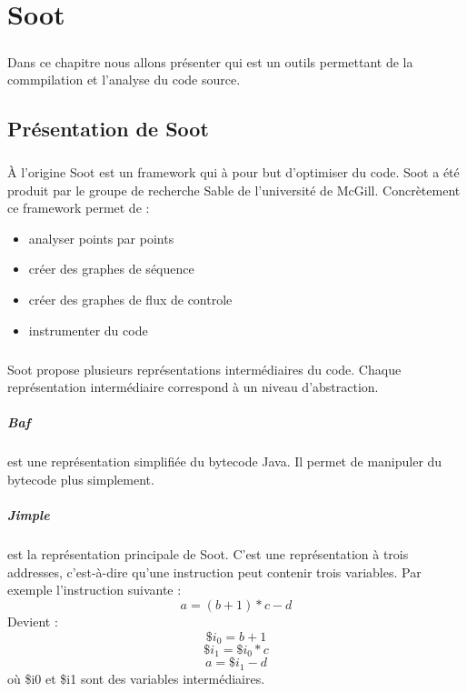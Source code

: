 \chapter{Soot}

\paragraph{}
Dans ce chapitre nous allons présenter \cite{Soot} qui est un outils permettant 
de la commpilation et l'analyse du code source.

	\section{Présentation de Soot}

	\paragraph{}
	À l'origine Soot est un framework qui à pour but d'optimiser du code. 
Soot a été produit par le groupe de recherche Sable de l'université de McGill. 
Concrètement ce framework permet de :

	\begin{itemize}
		\item analyser points par points
		\item créer des graphes de séquence
		\item créer des graphes de flux de controle
		\item instrumenter du code
	\end{itemize}

	\paragraph{}
	Soot propose plusieurs représentations intermédiaires du code. Chaque 
représentation intermédiaire correspond à un niveau d'abstraction.

	\paragraph{Baf} est une représentation simplifiée du bytecode Java. Il 
permet de manipuler du bytecode plus simplement.
	\paragraph{Jimple} est la représentation principale de Soot. C'est une 
représentation à trois addresses, c'est-à-dire qu'une instruction peut contenir 
trois variables. Par exemple l'instruction suivante : 
	$$ a = (b + 1) * c - d$$
	Devient : 
	$$ \$i_0 = b + 1$$
	$$ \$i_1 = \$i_0 * c$$
	$$ a = \$i_1 - d$$
	où \$i0 et \$i1 sont des variables intermédiaires.


